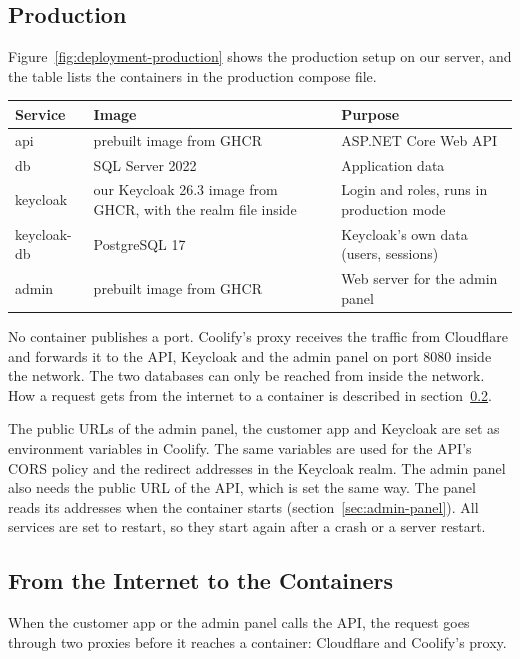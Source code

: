 \documentclass[a4paper,11pt]{article}
\begin{document}
\subsection{Production}
Figure~\ref{fig:deployment-production} shows the production setup on our server, and the table lists the containers in the production compose file.


\begin{center}
\begin{tabular}{@{}l p{4.5cm} p{5.5cm}@{}}
\textbf{Service} & \textbf{Image} & \textbf{Purpose} \\
\hline
api & prebuilt image from GHCR & ASP.NET Core Web API \\
db & SQL Server 2022 & Application data \\
keycloak & our Keycloak 26.3 image from GHCR, with the realm file inside & Login and roles, runs in production mode \\
keycloak-db & PostgreSQL 17 & Keycloak's own data (users, sessions) \\
admin & prebuilt image from GHCR & Web server for the admin panel \\
\end{tabular}
\end{center}

No container publishes a port. Coolify's proxy receives the traffic from Cloudflare and forwards it to the API, Keycloak and the admin panel on port 8080 inside the network. The two databases can only be reached from inside the network. How a request gets from the internet to a container is described in section~\ref{sec:request-path}.

The public URLs of the admin panel, the customer app and Keycloak are set as environment variables in Coolify. The same variables are used for the API's CORS policy and the redirect addresses in the Keycloak realm. The admin panel also needs the public URL of the API, which is set the same way. The panel reads its addresses when the container starts (section~\ref{sec:admin-panel}). All services are set to restart, so they start again after a crash or a server restart.

\subsection{From the Internet to the Containers}\label{sec:request-path}
When the customer app or the admin panel calls the API, the request goes through two proxies before it reaches a container: Cloudflare and Coolify's proxy.
\end{document}
